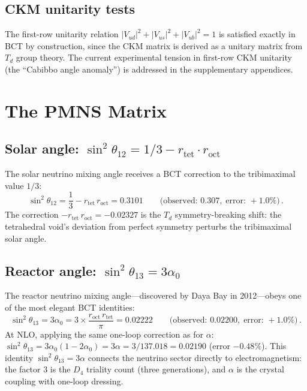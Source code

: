 \documentclass[review,number,sort&compress]{elsarticle}
\newcommand{\roct}{r_{\mathrm{oct}}}
\newcommand{\rtet}{r_{\mathrm{tet}}}
\newcommand{\azero}{\alpha_0}
\newcommand{\Td}{T_d}
\newcommand{\Dfour}{D_4}
\begin{document}
\subsection{CKM unitarity tests}

The first-row unitarity relation $|V_{ud}|^2 + |V_{us}|^2 + |V_{ub}|^2 = 1$
is satisfied exactly in BCT by construction, since the CKM matrix is
derived as a unitary matrix from $\Td$ group theory. The current
experimental tension in first-row CKM unitarity (the ``Cabibbo angle
anomaly'') is addressed in the supplementary appendices.

\section{The PMNS Matrix}
\label{sec:PMNS}

\subsection{Solar angle: $\sin^2\theta_{12} = 1/3 - \rtet\cdot\roct$}

The solar neutrino mixing angle receives a BCT correction to the
tribimaximal value $1/3$:
\begin{equation}
  \sin^2\theta_{12} = \frac{1}{3} - \rtet\,\roct = 0.3101 \qquad
  \bigl(\text{observed: } 0.307,\;\text{error: } +1.0\%\bigr)\,.
  \label{eq:theta12}
\end{equation}
The correction $-\rtet\,\roct = -0.02327$ is the $\Td$
symmetry-breaking shift: the tetrahedral void's deviation from perfect
symmetry perturbs the tribimaximal solar angle.

\subsection{Reactor angle: $\sin^2\theta_{13} = 3\azero$}

The reactor neutrino mixing angle---discovered by Daya Bay in
2012---obeys one of the most elegant BCT identities:
\begin{equation}
  \sin^2\theta_{13} = 3\azero = 3 \times \frac{\roct\,\rtet}{\pi}
  = 0.02222 \qquad
  \bigl(\text{observed: } 0.02200,\;\text{error: } +1.0\%\bigr)\,.
  \label{eq:theta13}
\end{equation}
At NLO, applying the same one-loop correction as for $\alpha$:
$\sin^2\theta_{13} = 3\azero(1 - 2\azero) = 3\alpha = 3/137.018
= 0.02190$ (error $-0.48\%$). This identity
$\sin^2\theta_{13} = 3\alpha$ connects the neutrino sector directly
to electromagnetism: the factor 3 is the $\Dfour$ triality count
(three generations), and $\alpha$ is the crystal coupling with
one-loop dressing.
\end{document}
